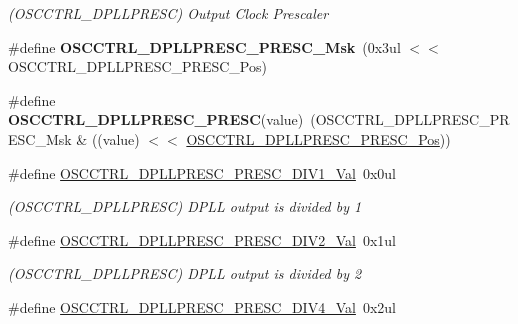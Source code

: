 \begin{DoxyCompactItemize}
\begin{DoxyCompactList}\small\item\em (O\+S\+C\+C\+T\+R\+L\+\_\+\+D\+P\+L\+L\+P\+R\+E\+S\+C) Output Clock Prescaler \end{DoxyCompactList}\item 
\hypertarget{group___s_a_m_l21___o_s_c_c_t_r_l_ga773853194412dd685c7e29e8b2bd35a3}{}\#define {\bfseries O\+S\+C\+C\+T\+R\+L\+\_\+\+D\+P\+L\+L\+P\+R\+E\+S\+C\+\_\+\+P\+R\+E\+S\+C\+\_\+\+Msk}~(0x3ul $<$$<$ O\+S\+C\+C\+T\+R\+L\+\_\+\+D\+P\+L\+L\+P\+R\+E\+S\+C\+\_\+\+P\+R\+E\+S\+C\+\_\+\+Pos)\label{group___s_a_m_l21___o_s_c_c_t_r_l_ga773853194412dd685c7e29e8b2bd35a3}

\item 
\hypertarget{group___s_a_m_l21___o_s_c_c_t_r_l_ga44f222db1749d06ccdc80ffc10098559}{}\#define {\bfseries O\+S\+C\+C\+T\+R\+L\+\_\+\+D\+P\+L\+L\+P\+R\+E\+S\+C\+\_\+\+P\+R\+E\+S\+C}(value)~(O\+S\+C\+C\+T\+R\+L\+\_\+\+D\+P\+L\+L\+P\+R\+E\+S\+C\+\_\+\+P\+R\+E\+S\+C\+\_\+\+Msk \& ((value) $<$$<$ \hyperlink{group___s_a_m_l21___o_s_c_c_t_r_l_ga54c15cc2481ad7fcd40eb19d9011319a}{O\+S\+C\+C\+T\+R\+L\+\_\+\+D\+P\+L\+L\+P\+R\+E\+S\+C\+\_\+\+P\+R\+E\+S\+C\+\_\+\+Pos}))\label{group___s_a_m_l21___o_s_c_c_t_r_l_ga44f222db1749d06ccdc80ffc10098559}

\item 
\hypertarget{group___s_a_m_l21___o_s_c_c_t_r_l_ga20a6d306d06c72ebae23105a26793ef4}{}\#define \hyperlink{group___s_a_m_l21___o_s_c_c_t_r_l_ga20a6d306d06c72ebae23105a26793ef4}{O\+S\+C\+C\+T\+R\+L\+\_\+\+D\+P\+L\+L\+P\+R\+E\+S\+C\+\_\+\+P\+R\+E\+S\+C\+\_\+\+D\+I\+V1\+\_\+\+Val}~0x0ul\label{group___s_a_m_l21___o_s_c_c_t_r_l_ga20a6d306d06c72ebae23105a26793ef4}

\begin{DoxyCompactList}\small\item\em (O\+S\+C\+C\+T\+R\+L\+\_\+\+D\+P\+L\+L\+P\+R\+E\+S\+C) D\+P\+L\+L output is divided by 1 \end{DoxyCompactList}\item 
\hypertarget{group___s_a_m_l21___o_s_c_c_t_r_l_ga84dc31d561ba451b4d69adfb0bdbc0a5}{}\#define \hyperlink{group___s_a_m_l21___o_s_c_c_t_r_l_ga84dc31d561ba451b4d69adfb0bdbc0a5}{O\+S\+C\+C\+T\+R\+L\+\_\+\+D\+P\+L\+L\+P\+R\+E\+S\+C\+\_\+\+P\+R\+E\+S\+C\+\_\+\+D\+I\+V2\+\_\+\+Val}~0x1ul\label{group___s_a_m_l21___o_s_c_c_t_r_l_ga84dc31d561ba451b4d69adfb0bdbc0a5}

\begin{DoxyCompactList}\small\item\em (O\+S\+C\+C\+T\+R\+L\+\_\+\+D\+P\+L\+L\+P\+R\+E\+S\+C) D\+P\+L\+L output is divided by 2 \end{DoxyCompactList}\item 
\hypertarget{group___s_a_m_l21___o_s_c_c_t_r_l_ga6143f75f33c3d6ef3626eef0955f96f9}{}\#define \hyperlink{group___s_a_m_l21___o_s_c_c_t_r_l_ga6143f75f33c3d6ef3626eef0955f96f9}{O\+S\+C\+C\+T\+R\+L\+\_\+\+D\+P\+L\+L\+P\+R\+E\+S\+C\+\_\+\+P\+R\+E\+S\+C\+\_\+\+D\+I\+V4\+\_\+\+Val}~0x2ul\label{group___s_a_m_l21___o_s_c_c_t_r_l_ga6143f75f33c3d6ef3626eef0955f96f9}


\end{DoxyCompactItemize}
